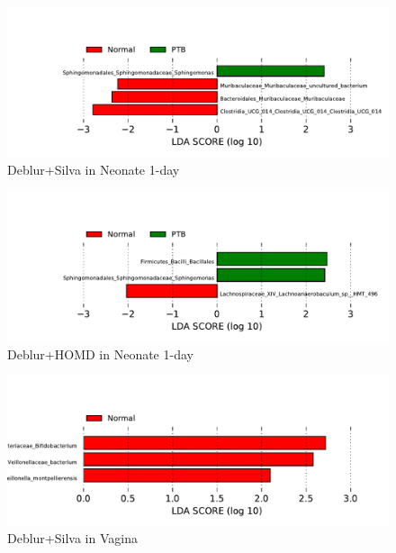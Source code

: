 \documentclass{beamer}
\begin{document}
\begin{frame}[allowframebreaks]
        \begin{figure}
            \includegraphics[width=\linewidth]{figures/LEfSe/Default/everything.Deblur.silva.Neonate-1day.pdf}
            \caption{Deblur+Silva in Neonate 1-day}
        \end{figure}

        \begin{figure}
            \includegraphics[width=\linewidth]{figures/LEfSe/Default/everything.Deblur.homd.Neonate-1day.pdf}
            \caption{Deblur+HOMD in Neonate 1-day}
        \end{figure}

        \begin{figure}
            \includegraphics[width=\linewidth]{figures/LEfSe/Default/everything.Deblur.silva.Vagina.pdf}
            \caption{Deblur+Silva in Vagina}
        \end{figure}
    \end{frame}
\end{document}
